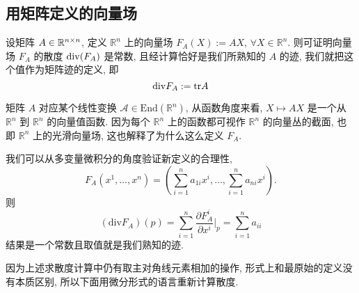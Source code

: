 \subsection{用矩阵定义的向量场}
    设矩阵  $A\in\mathbb{R}^{n\times n}$, 定义 $\mathbb{R}^n$ 上的向量场 $F_A(X) := AX,\,\forall X\in\mathbb{R}^n$.
    则可证明向量场 $F_A$ 的散度 ${\rm div}(F_A)$ 是常数, 且经计算恰好是我们所熟知的 $A$ 的迹, 我们就把这个值作为矩阵迹的定义, 即
    \begin{equation*}
        {\rm div}F_A := {\rm tr}A
    \end{equation*}
    \begin{remark}
        矩阵 $A$ 对应某个线性变换 $\mathcal{A}\in\mathrm{End}(\mathbb{R}^n)$, 从函数角度来看,   $X\mapsto AX$ 是一个从 $\mathbb{R}^n$ 到 $\mathbb{R}^n$ 的向量值函数.
        因为每个 $\mathbb{R}^n$ 上的函数都可视作 $\mathbb{R}^n$ 的向量丛的截面, 也即 $\mathbb{R}^n$ 上的光滑向量场, 这也解释了为什么这么定义 $F_A$.
    \end{remark}
    \begin{remark}
        我们可以从多变量微积分的角度验证新定义的合理性,
        \begin{equation*}
            F_A(x^1,\dots,x^n) = (\sum_{i=1}^{n}a_{1i}x^i,\dots,\sum_{i=1}^{n}a_{ni}x^i).
        \end{equation*}
        则
        \begin{equation*}
            (\mathrm{div} F_A)(p) = \sum_{i=1}^{n}\frac{\partial F_A^i}{\partial x^i}\Bigg|_p = \sum_{i=1}^{n}a_{ii}
        \end{equation*}
        结果是一个常数且取值就是我们熟知的迹.
    \end{remark}
    因为上述求散度计算中仍有取主对角线元素相加的操作, 形式上和最原始的定义没有本质区别, 所以下面用微分形式的语言重新计算散度.

